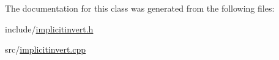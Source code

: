 The documentation for this class was generated from the following files:\begin{DoxyCompactItemize}
\item 
include/\hyperlink{implicitinvert_8h}{implicitinvert.h}\item 
src/\hyperlink{implicitinvert_8cpp}{implicitinvert.cpp}\end{DoxyCompactItemize}
